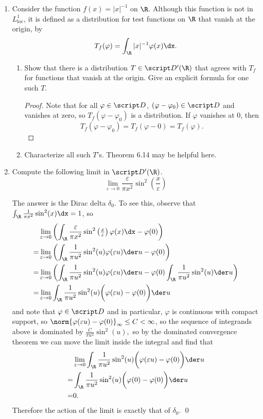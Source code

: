 \documentclass[12pt,letterpaper]{article}
\renewcommand{\phi}{\varphi}
\renewcommand{\epsilon}{\varepsilon}
\begin{document}
\begin{enumerate}
\item Consider the function $f(x)=|x|^{-1}$ on $\R$. Although this function is not in $L^1_{\text{loc}}$, it is defined as a distribution for test functions on $\R$ that vanish at the origin, by 
$$T_f(\phi) = \int_\R |x|^{-1}\phi(x)\dx.$$
	\begin{enumerate}[label=(\alph*)]
	\item Show that there is a distribution $T\in\D'(\R)$ that agrees with $T_f$ for functions that vanish at the origin. Give an explicit formula for one such $T$. 
	\begin{proof}
	Note that for all $\phi\in\D$, $(\phi-\phi_0)\in\D$ and vanishes at zero, so $T_f(\phi-\phi_0)$ is a distribution. If $\phi$ vanishes at 0, then 
	$$T_f(\phi-\phi_0) = T_f(\phi-0) = T_f(\phi).$$
	\end{proof}
	\item Characterize all such $T$'s. Theorem 6.14 may be helpful here. 
	\end{enumerate}

\item Compute the following limit in $\D'(\R)$. 
$$\lim_{\epsilon\to 0}\frac{\epsilon}{\pi x^2}\sin^2 \left(\frac{x}{\epsilon}\right)$$

\answer
The answer is the Dirac delta $\delta_0$. To see this, observe that $\int_\R\frac{1}{\pi x^2}\sin^2 (x) \dx = 1$, so
\begin{align*}
&\lim_{\epsilon\to 0}\left(\int_\R\frac{\epsilon}{\pi x^2}\sin^2 \left(\tfrac{x}{\epsilon}\right)\phi(x)\dx     -    \phi(0)\right) \\
= &\lim_{\epsilon\to 0}\left(\int_\R\frac{1}{\pi u^2}\sin^2 (u)\phi(\epsilon u)\der u      -      \phi(0)\right) \\
= &\lim_{\epsilon\to 0}\left(\int_\R\frac{1}{\pi u^2}\sin^2 (u)\phi(\epsilon u)\der u      -      \phi(0)\int_\R\frac{1}{\pi u^2}\sin^2 (u)\der u\right) \\
= &\lim_{\epsilon\to 0}\int_\R\frac{1}{\pi u^2}\sin^2 (u) \bigg(\phi(\epsilon u) - \phi(0)\bigg)\der u  \\
\end{align*}
and note that $\phi\in\D$ and in particular, $\phi$ is continuous with compact support, so $\norm{\phi(\epsilon u) - \phi(0)}_\infty\leq C< \infty$, so the sequence of integrands above is dominated by 
$\frac{C}{\pi u^2}\sin^2 (u),$
so by the dominated convergence theorem we can move the limit inside the integral and find that 
\begin{align*}
&\lim_{\epsilon\to 0}\int_\R\frac{1}{\pi u^2}\sin^2 (u) \bigg(\phi(\epsilon u) - \phi(0)\bigg)\der u  \\
=&\int_\R\frac{1}{\pi u^2}\sin^2 (u) \bigg(\phi(0) - \phi(0)\bigg)\der u  \\
=&0.
\end{align*}
Therefore the action of the limit is exactly that of $\delta_0$. 
\qed

\end{enumerate}
\end{document}
